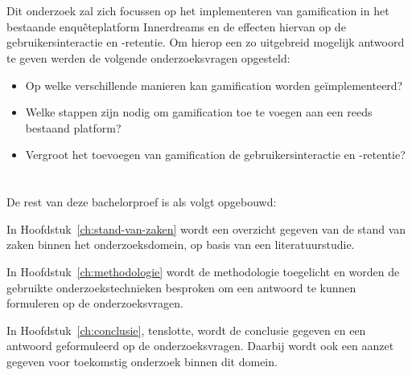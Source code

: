 \section{}
\label{sec:onderzoeksvraag}

Dit onderzoek zal zich focussen op het implementeren van gamification in het bestaande enquêteplatform Innerdreams en de effecten hiervan op de gebruikersinteractie en -retentie. Om hierop een zo uitgebreid mogelijk antwoord te geven werden de volgende onderzoeksvragen opgesteld:

\begin{itemize}
 \item Op welke verschillende manieren kan gamification worden geïmplementeerd?
 \item Welke stappen zijn nodig om gamification toe te voegen aan een reeds bestaand platform?
 \item Vergroot het toevoegen van gamification de gebruikersinteractie en -retentie?
\end{itemize}


\section{}
\label{sec:onderzoeksdoelstelling}

\section{}
\label{sec:opzet-bachelorproef}


De rest van deze bachelorproef is als volgt opgebouwd:

In Hoofdstuk~\ref{ch:stand-van-zaken} wordt een overzicht gegeven van de stand van zaken binnen het onderzoeksdomein, op basis van een literatuurstudie.

In Hoofdstuk~\ref{ch:methodologie} wordt de methodologie toegelicht en worden de gebruikte onderzoekstechnieken besproken om een antwoord te kunnen formuleren op de onderzoeksvragen.


In Hoofdstuk~\ref{ch:conclusie}, tenslotte, wordt de conclusie gegeven en een antwoord geformuleerd op de onderzoeksvragen. Daarbij wordt ook een aanzet gegeven voor toekomstig onderzoek binnen dit domein.